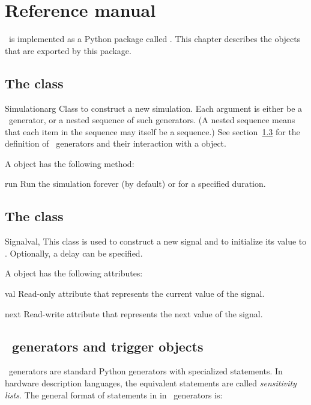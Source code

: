 \chapter{Reference manual}


\myhdl\ is implemented as a Python package called . This
chapter describes the objects that are exported by this package.

\section{The  class}
\begin{classdesc}{Simulation}{arg }
Class to construct a new simulation. Each argument is either be a
\myhdl\ generator, or a nested sequence of such generators. (A nested
sequence means that each item in the sequence may itself be a
sequence.) See section~\ref{myhdl-generators} for the definition of
\myhdl\ generators and their interaction with a 
object. 
\end{classdesc}

A  object has the following method:

\begin{methoddesc}[Simulation]{run}{}
Run the simulation forever (by default) or for a specified duration.
\end{methoddesc}

\section{The  class}
\label{signal}
\begin{classdesc}{Signal}{val, }
This class is used to construct a new signal and to initialize its
value to . Optionally, a delay can be specified.
\end{classdesc}

A  object has the following attributes:

\begin{memberdesc}[Signal]{val}
Read-only attribute that represents the current value of the signal. 
\end{memberdesc}
\begin{memberdesc}[Signal]{next}
Read-write attribute that represents the next value of the signal.
\end{memberdesc}

\section{\myhdl\ generators and trigger objects}
\label{myhdl-generators}
\myhdl\ generators are standard Python generators with specialized
 statements. In hardware description languages, the equivalent
statements are called \emph{sensitivity lists}. The general format
of  statements in in \myhdl\ generators is:


